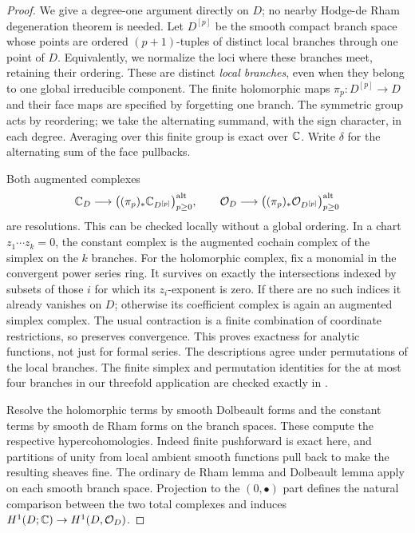 \begin{proof}
We give a degree-one argument directly on $D$; no nearby
Hodge-de Rham degeneration theorem is needed. Let
$D^{[p]}$ be the smooth compact branch space whose points are
ordered $(p+1)$-tuples of distinct local branches through one
point of $D$. Equivalently, we normalize the loci where these
branches meet, retaining their ordering. These are distinct
\emph{local branches}, even when they belong to one global
irreducible component. The finite holomorphic maps
$\pi_p:D^{[p]}\to D$ and their face maps are specified by
forgetting one branch. The symmetric group acts by reordering;
we take the alternating summand, with the sign character, in
each degree. Averaging over this finite group is exact over
$\mathbb C$. Write $\delta$ for the alternating sum of the face
pullbacks.

Both augmented complexes
\[
 \mathbb C_D\longrightarrow
 \bigl((\pi_p)_*\mathbb C_{D^{[p]}}\bigr)_{p\geq0}^{\mathrm{alt}},
 \qquad
 \mathcal O_D\longrightarrow
 \bigl((\pi_p)_*\mathcal O_{D^{[p]}}\bigr)_{p\geq0}^{\mathrm{alt}}
\]
are resolutions. This can be checked locally without a global
ordering. In a chart $z_1\cdots z_k=0$, the constant complex is
the augmented cochain complex of the simplex on the $k$ branches.
For the holomorphic complex, fix a monomial in the convergent
power series ring. It survives on exactly the intersections
indexed by subsets of those $i$ for which its $z_i$-exponent is
zero. If there are no such indices it already vanishes on $D$;
otherwise its coefficient complex is again an augmented simplex
complex. The usual contraction is a finite combination of
coordinate restrictions, so preserves convergence. This proves
exactness for analytic functions, not just for formal series.
The descriptions agree under permutations of the local branches.
The finite simplex and permutation identities for the at most
four branches in our threefold application are checked exactly
in .

Resolve the holomorphic terms by smooth Dolbeault forms and
the constant terms by smooth de Rham forms on the branch spaces.
These compute the respective hypercohomologies. Indeed finite
pushforward is exact here, and partitions of unity from local
ambient smooth functions pull back to make the resulting sheaves
fine. The ordinary de Rham lemma and Dolbeault lemma apply on
each smooth branch space. Projection to the $(0,\bullet)$
part defines the natural comparison between the two total
complexes and induces $H^1(D;\mathbb C)\to H^1(D,\mathcal O_D)$.


\end{proof}
